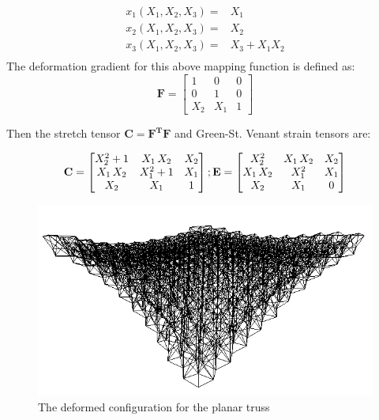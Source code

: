 \begin{equation}
\begin{aligned}
x_1(X_1,X_2,X_3) = & X_1 \\
x_2(X_1,X_2,X_3) = & X_2 \\
x_3(X_1,X_2,X_3) = & X_3+X_1 X_2 \\
\end{aligned}
\label{doubly_curved_mapping:eqn}
\end{equation}
The deformation gradient for this above mapping function is defined as:
\begin{equation}
\mathbf F=
\begin{bmatrix}
1&0&0 \\
0&1&0 \\
X_2 & X_1 & 1
\end{bmatrix}
\label{deformation_gradient_doubly_curved_mapping:eqn}
\end{equation}

Then the stretch tensor $\mathbf C=\mathbf {F^T F}$ and Green-St. Venant strain tensors are:

\begin{equation}
\mathbf C=
\begin{bmatrix}
X_{2}^2+1&X_{1}\,
X_{2}&X_{2}\cr X_{1}\,X_{2}&X_{1}^2+1&X_{
 1}\cr X_{2}&X_{1}&1\cr 
\end{bmatrix}
; \mathbf E=
\begin{bmatrix}
X_{2}^2&X_{1}\,X_{2}&X_{2}\cr X_{1}\,X_{2}&X_{1}^2&X_{1}\cr X_{2}&X_{1}&0\cr 
 \end{bmatrix}
\label{green_deformation_tensor_doubly_curved_mapping:eqn}
\end{equation} 
  
\begin{figure} 
\centering
\includegraphics[width=5.0in]{./chap_5_active_trusses/images_space_filler/planar_truss_deformed_config.png}
\caption{The deformed configuration for the planar truss}
\label{fig:planar_truss_deformed_config}
\end{figure}

